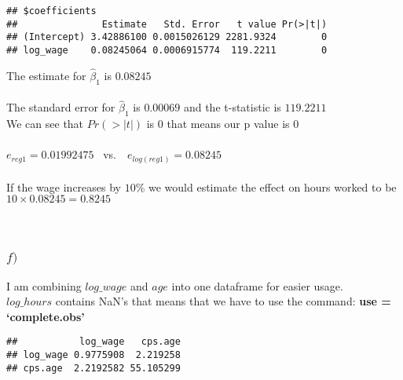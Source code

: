 \documentclass[
]{article}
\newenvironment{Shaded}{\begin{snugshade}}{\end{snugshade}}
\newcommand{\DataTypeTok}[1]{\textcolor[rgb]{0.13,0.29,0.53}{#1}}
\newcommand{\FloatTok}[1]{\textcolor[rgb]{0.00,0.00,0.81}{#1}}
\newcommand{\KeywordTok}[1]{\textcolor[rgb]{0.13,0.29,0.53}{\textbf{#1}}}
\newcommand{\NormalTok}[1]{#1}
\newcommand{\OperatorTok}[1]{\textcolor[rgb]{0.81,0.36,0.00}{\textbf{#1}}}
\newcommand{\OtherTok}[1]{\textcolor[rgb]{0.56,0.35,0.01}{#1}}
\newcommand{\StringTok}[1]{\textcolor[rgb]{0.31,0.60,0.02}{#1}}
\begin{document}
\begin{verbatim}
## $coefficients
##               Estimate   Std. Error   t value Pr(>|t|)
## (Intercept) 3.42886100 0.0015026129 2281.9324        0
## log_wage    0.08245064 0.0006915774  119.2211        0
\end{verbatim}

The estimate for \(\hat{\beta}_1\) is \(0.08245\)\\
~\\
The standard error for \(\hat{\beta}_1\) is \(0.00069\) and the
t-statistic is \(119.2211\)\\
We can see that \(Pr(>|t|)\) is \(0\) that means our p value is 0\\
~\\
\(e_{reg1} = 0.01992475\) ~vs.~~\(e_{log(reg1)} = 0.08245\)\\
~\\
If the wage increases by \(10\)\% we would estimate the effect on hours
worked to be \(10 \times 0.08245 = 0.8245\)\\
~\\
~\\

\hypertarget{f}{%
\subsubsection{\texorpdfstring{\(f)\)}{f)}}\label{f}}

\hfill\break
I am combining \(log\_wage\) and \(age\) into one dataframe for easier
usage.\\
\(log\_hours\) contains NaN's that means that we have to use the
command: \textbf{use = `complete.obs'}

\begin{Shaded}
\end{Shaded}

\begin{verbatim}
##           log_wage   cps.age
## log_wage 0.9775908  2.219258
## cps.age  2.2192582 55.105299
\end{verbatim}

\begin{Shaded}
\end{Shaded}
\end{document}
